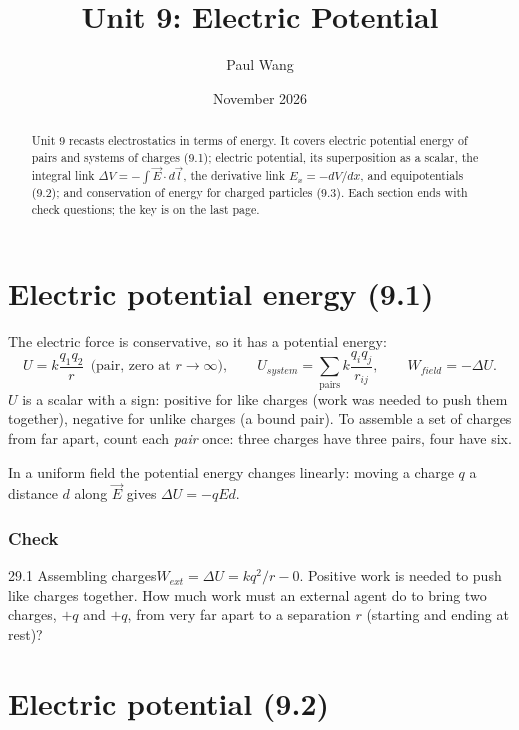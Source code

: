 \documentclass[11pt]{article}
\title{Unit 9: Electric Potential}
\author{Paul Wang}
\date{November 2026}
\begin{document}
\maketitle

\begin{abstract}
Unit 9 recasts electrostatics in terms of energy. It covers electric potential energy of pairs and systems of charges (9.1); electric potential, its superposition as a scalar, the integral link $\Delta V = -\int\vec E\cdot d\vec l$, the derivative link $E_x = -dV/dx$, and equipotentials (9.2); and conservation of energy for charged particles (9.3). Each section ends with check questions; the key is on the last page.
\end{abstract}


\section{Electric potential energy (9.1)}\label{sec:1}

The electric force is conservative, so it has a potential energy:
\[ U = k\frac{q_1q_2}{r}\ \ \text{(pair, zero at } r\to\infty), \qquad U_{system} = \sum_{\text{pairs}} k\frac{q_iq_j}{r_{ij}}, \qquad W_{field} = -\Delta U. \]
$U$ is a scalar with a sign: positive for like charges (work was needed to push them together), negative for unlike charges (a bound pair). To assemble a set of charges from far apart, count each \emph{pair} once: three charges have three pairs, four have six.

In a uniform field the potential energy changes linearly: moving a charge $q$ a distance $d$ along $\vec E$ gives $\Delta U = -qEd$.

\subsubsection{Check}\mbox{}

\begin{q}{2}{9.1 Assembling charges}{$W_{ext} = \Delta U = kq^2/r - 0$. Positive work is needed to push like charges together.}
How much work must an external agent do to bring two charges, $+q$ and $+q$, from very far apart to a separation $r$ (starting and ending at rest)?
\end{q}

\section{Electric potential (9.2)}\label{sec:2}
\end{document}
